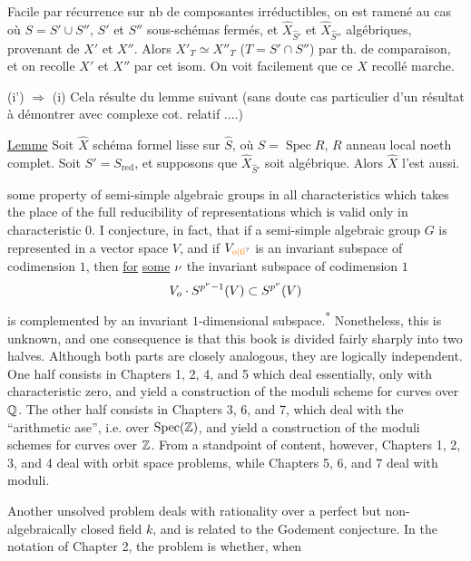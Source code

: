 Facile par récurrence sur nb de composantes irréductibles, on est ramené au cas où $S=S'\cup S''$, $S'$ et $S''$ sous-schémas fermés, et $\widehat X_{\widehat S'}$ et $\widehat X_{\widehat S''}$  algébriques, provenant de $X'$ et $X''$. Alors $X'_T\simeq X''_T$ ($T=S'\cap S''$) par th. de comparaison, et on recolle $X'$ et $X''$ par cet isom. On voit facilement que ce $X$ recollé marche.

(i') $\Longrightarrow$ (i) \quad Cela résulte du lemme suivant (sans doute cas particulier d'un  résultat à démontrer avec complexe cot. relatif ....)

\uline{Lemme} Soit $\widehat X$ schéma formel  lisse sur $\widehat S$, où $S=\operatorname{Spec} R$, $R$ anneau local noeth complet. Soit $S'=S_{\text{red}}$, et supposons que $\widehat X_{\widehat S'}$ soit algébrique. Alors $\widehat X$ l'est aussi.

some property of semi-simple algebraic groups in all characteristics which takes the place of the full reducibility of representations which is valid only in characteristic $0$. I conjecture, in fact, that if a semi-simple algebraic group $G$ is represented in a vector space $V$, and if $V_{\unsure{o|0}}$ is an invariant subspace of codimension $1$, then \uline{for} \uline{some} \uline{$\nu$} the invariant subspace of codimension $1$
\[
V_o\cdot S^{p^{\nu}-1}(V)\subset S^{p^{\nu}}(V)
\]
is complemented by an invariant $1$-dimensional subspace.\textsuperscript{*} Nonetheless, this is unknown, and one consequence is that this book is divided fairly sharply into two halves. Although both parts are closely analogous, they are logically independent. One half consists in Chapters 1, 2, 4, and 5 which deal essentially, only with characteristic zero, and yield a construction of the moduli scheme for curves over $\mathbb Q$. The other half consists in Chapters 3, 6, and 7, which deal with the ``arithmetic ase'', i.e. over $\operatorname{Spec}(\mathbb Z)$, and yield a construction of the moduli schemes for curves over $\mathbb Z$. From a standpoint of content, however, Chapters 1, 2, 3, and 4 deal with orbit space problems, while Chapters 5, 6, and 7 deal with moduli.

Another unsolved problem deals with rationality over a perfect but non-algebraically closed field $k$, and is related to the Godement conjecture. In the notation of Chapter 2, the problem is whether, when


